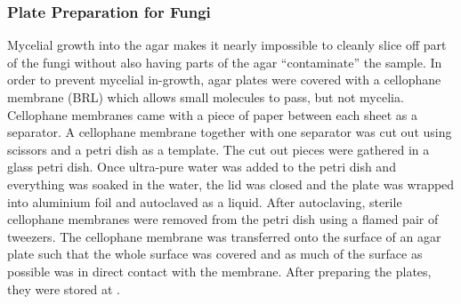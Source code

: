 \subsubsection{Plate Preparation for Fungi}
Mycelial growth into the agar makes it nearly impossible to cleanly slice off part of the fungi without also having parts of the agar \enquote{contaminate} the sample. In order to prevent mycelial in-growth, agar plates were covered with a cellophane membrane (BRL) which allows small molecules to pass, but not mycelia.
Cellophane membranes came with a piece of paper between each sheet as a separator. A cellophane membrane together with one separator was cut out using scissors and a petri dish as a template. The cut out pieces were gathered in a glass petri dish. Once ultra-pure water was added to the petri dish and everything was soaked in the water, the lid was closed and the plate was wrapped into aluminium foil and autoclaved as a liquid.
After autoclaving, sterile cellophane membranes were removed from the petri dish using a flamed pair of tweezers. The cellophane membrane was transferred onto the surface of an agar plate such that the whole surface was covered and as much of the surface as possible was in direct contact with the membrane. After preparing the plates, they were stored at .

